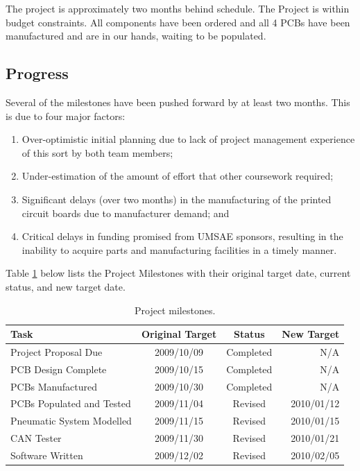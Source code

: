 \documentclass[12pt]{report}
\begin{document}
  The project is approximately two months behind schedule. The Project is within budget constraints. All components have been ordered and all 4 PCBs have been manufactured and are in our hands, waiting to be populated.

  \subsection{Progress}

  Several of the milestones have been pushed forward by at least two months. This is due to four major factors:
  \begin{enumerate}
  \item Over-optimistic initial planning due to lack of project management experience of this sort by both team members;
  \item Under-estimation of the amount of effort that other coursework required;
  \item Significant delays (over two months) in the manufacturing of the printed circuit boards due to manufacturer demand; and
  \item Critical delays in funding promised from UMSAE sponsors, resulting in the inability to acquire parts and manufacturing facilities in a timely manner.
  \end{enumerate}

  Table \ref{table:milestones} below lists the Project Milestones with their original target date, current status, and new target date.

  \begin{table}[H]
    \caption{Project milestones.}
    \label{table:milestones}
    \centering
    \begin{tabular}{|l|c|c|r|}
      \hline
      Task & Original Target & Status & New Target\\
      \hline
      Project Proposal Due & 2009/10/09 & Completed & N/A \\
      PCB Design Complete & 2009/10/15 & Completed & N/A  \\
      PCBs Manufactured & 2009/10/30 & Completed & N/A \\
      PCBs Populated and Tested & 2009/11/04 & Revised & 2010/01/12 \\
      Pneumatic System Modelled & 2009/11/15 & Revised & 2010/01/15 \\
      CAN Tester & 2009/11/30 & Revised & 2010/01/21 \\
      Software Written & 2009/12/02 & Revised & 2010/02/05 \\
      \hline
    \end{tabular}
  \end{table}
\end{document}
